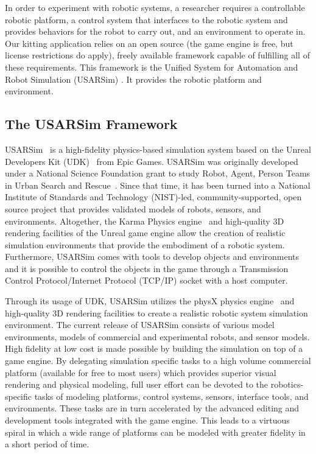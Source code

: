 \label{sect:simulation}
In order to experiment with robotic systems, a researcher requires a controllable robotic platform, a control system that interfaces to the robotic system and provides behaviors for the robot to carry out, and an environment to operate in. Our kitting application relies on an open source (the game engine is free, but license restrictions do apply), freely available framework capable of fulfilling all of these requirements. This framework is the Unified System for Automation and Robot Simulation (USARSim) \cite{USARSimWeb}. It provides the robotic platform and environment.

\subsection{The USARSim Framework}

USARSim~\cite{CARPIN.LNAI.2006,WANG.WSC.2003} is a high-fidelity physics-based simulation system based on the Unreal Developers Kit (UDK)~\cite{UDKWeb} from Epic Games. USARSim was originally developed under a National Science Foundation grant to study Robot, Agent, Person Teams in Urban Search and Rescue~\cite{LEWIS.ICHC.2003}. Since that time, it has been turned into a National Institute of Standards and Technology (NIST)-led, community-supported, open source project that provides validated models of robots, sensors, and environments. Altogether, the Karma Physics engine~\cite{KarmEngine} and high-quality 3D rendering facilities of the Unreal game engine allow the creation of realistic simulation environments that provide the embodiment of a robotic system. Furthermore, USARSim comes with tools to develop objects and environments and it is possible to control the objects in the game through a Transmission Control Protocol/Internet Protocol (TCP/IP) socket with a host computer.

Through its usage of UDK, USARSim utilizes the physX physics engine~\cite{physXWeb} and high-quality 3D rendering facilities to create a realistic robotic system simulation environment. The current release of USARSim consists of various model environments, models of commercial and experimental robots, and sensor models. High fidelity at low cost is made possible by building the simulation on top of a game engine. By delegating  simulation specific tasks to a high volume commercial platform (available for free to most users) which provides superior visual rendering and physical modeling, full user effort can be devoted to the robotics-specific tasks of modeling platforms, control systems, sensors, interface tools, and environments. These tasks are in turn accelerated by the advanced editing and development tools integrated with the game engine. This leads to a virtuous spiral in which a wide range of platforms can be modeled with greater fidelity in a short period of time.

